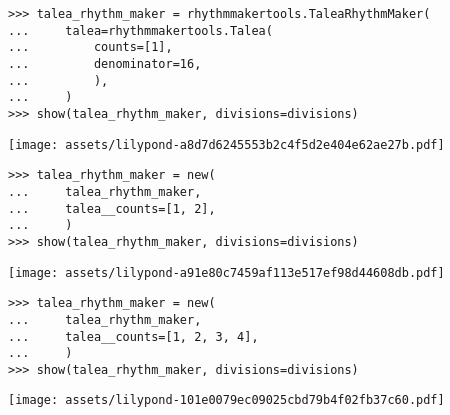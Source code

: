 \begin{comment}
<abjad>
talea_rhythm_maker = rhythmmakertools.TaleaRhythmMaker(
    talea=rhythmmakertools.Talea(
        counts=[1],
        denominator=16,
        ),
    )
show(talea_rhythm_maker, divisions=divisions)
</abjad>
\end{comment}

\begin{singlespacing}
\vspace{-0.5\baselineskip}
\begin{lstlisting}
>>> talea_rhythm_maker = rhythmmakertools.TaleaRhythmMaker(
...     talea=rhythmmakertools.Talea(
...         counts=[1],
...         denominator=16,
...         ),
...     )
>>> show(talea_rhythm_maker, divisions=divisions)
\end{lstlisting}
\noindent\texttt{[image: assets/lilypond-a8d7d6245553b2c4f5d2e404e62ae27b.pdf]}
\end{singlespacing}

\begin{comment}
<abjad>
talea_rhythm_maker = new(
    talea_rhythm_maker,
    talea__counts=[1, 2],
    )
show(talea_rhythm_maker, divisions=divisions)
</abjad>
\end{comment}

\begin{singlespacing}
\vspace{-0.5\baselineskip}
\begin{lstlisting}
>>> talea_rhythm_maker = new(
...     talea_rhythm_maker,
...     talea__counts=[1, 2],
...     )
>>> show(talea_rhythm_maker, divisions=divisions)
\end{lstlisting}
\noindent\texttt{[image: assets/lilypond-a91e80c7459af113e517ef98d44608db.pdf]}
\end{singlespacing}

\begin{comment}
<abjad>
talea_rhythm_maker = new(
    talea_rhythm_maker,
    talea__counts=[1, 2, 3, 4],
    )
show(talea_rhythm_maker, divisions=divisions)
</abjad>
\end{comment}

\begin{singlespacing}
\vspace{-0.5\baselineskip}
\begin{lstlisting}
>>> talea_rhythm_maker = new(
...     talea_rhythm_maker,
...     talea__counts=[1, 2, 3, 4],
...     )
>>> show(talea_rhythm_maker, divisions=divisions)
\end{lstlisting}
\noindent\texttt{[image: assets/lilypond-101e0079ec09025cbd79b4f02fb37c60.pdf]}
\end{singlespacing}

